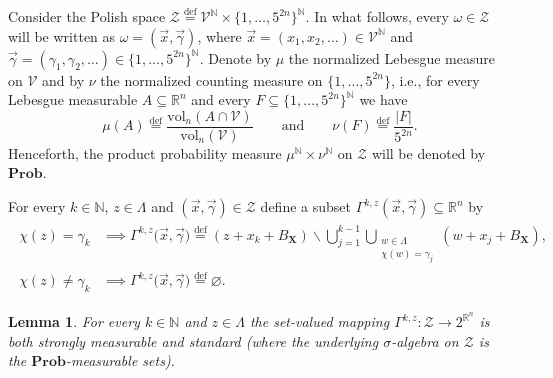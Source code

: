 \documentclass[11pt,reqno]{amsart}
\renewcommand{\setminus}{\smallsetminus}
\newcommand{\X}{\mathbf X}
\newcommand{\R}{\mathbb R}
\newtheorem{lemma}[theorem]{Lemma}
\theoremstyle{remark}
\renewcommand{\subset}{\subseteq}
\newcommand{\N}{\mathbb N}
\newcommand{\eqdef}{\stackrel{\mathrm{def}}{=}}
\renewcommand{\Pr}{\mathbf{Prob}}
\renewcommand{\emptyset}{\varnothing}
\newcommand{\vol}{\mathrm{vol}}
\renewcommand{\1}{\mathbf 1}
\newcommand{\ZZ}{\mathcal{Z}}
\newcommand{\DD}{\mathscr{V}}
\begin{document}
Consider the Polish space
$
\ZZ\eqdef\DD^\N\times \{1,\ldots,5^{2n}\}^\N.
$
In what follows, every $\omega\in \ZZ$ will be written as $\omega=(\vec{x},\vec{\gamma})$, where $\vec{x}=(x_1,x_2,\ldots)\in \DD^\N$ and $\vec{\gamma}=(\gamma_1,\gamma_2,\ldots)\in \{1,\ldots,5^{2n}\}^\N$. Denote by $\mu$ the normalized Lebesgue measure on $\DD$ and by $\nu$ the normalized counting measure on $\{1,\ldots,5^{2n}\}$, i.e.,  for every Lebesgue measurable $A\subset \R^n$ and every $F\subset \{1,\ldots,5^{2n}\}^\N$ we have
$$
\mu(A)\eqdef \frac{\vol_n(A\cap \DD)}{\vol_n(\DD)}\qquad \mathrm{and}\qquad  \nu(F)\eqdef \frac{|F|}{5^{2n}}.
 $$
Henceforth, the product probability measure $\mu^\N\times \nu^\N$ on $\ZZ$ will be denoted by $\Pr$.

For every $k\in \N$, $z\in \Lambda$ and $(\vec{x},\vec{\gamma})\in \ZZ$ define a subset $\Gamma^{k,z}(\vec{x},\vec{\gamma})\subset \R^n$ by
\begin{align}\label{def of our parition}
\begin{split}
\chi(z)=\gamma_k&\implies \Gamma^{k,z}\big(\vec{x},\vec{\gamma}\big)\eqdef (z+x_k+B_{\X}) \setminus \bigcup_{j=1}^{k-1}\bigcup_{\substack{w\in \Lambda\\ \chi(w)=\gamma_j}}(w+x_j+B_{\X}),\\
\chi(z)\neq \gamma_k&\implies \Gamma^{k,z}\big(\vec{x},\vec{\gamma}\big)\eqdef \emptyset.
\end{split}
\end{align}



\begin{lemma}\label{lem:measurability gamma} For every $k\in \N$ and $z\in \Lambda$ the set-valued mapping $\Gamma^{k,z}:\ZZ\to 2^{\R^n}$ is both strongly measurable and standard (where the underlying $\sigma$-algebra on $\ZZ$ is the $\Pr$-measurable sets).
\end{lemma}
\end{document}
